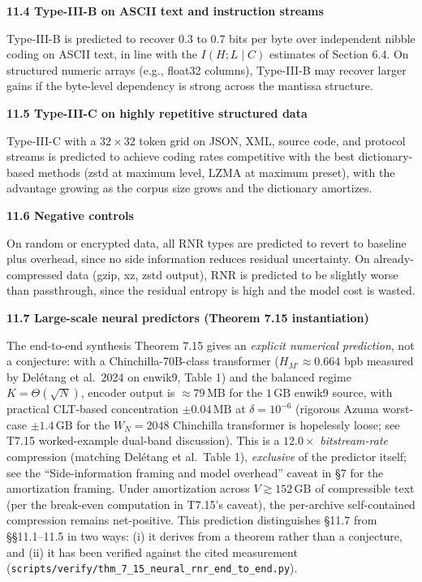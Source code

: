 \documentclass[
]{article}
\begin{document}
\textbf{11.4 Type-III-B on ASCII text and instruction streams}

Type-III-B is predicted to recover 0.3 to 0.7 bits per byte over
independent nibble coding on ASCII text, in line with the
$I(H ; L \mid C)$ estimates of Section 6.4. On structured numeric
arrays (e.g., float32 columns), Type-III-B may recover larger gains
if the byte-level dependency is strong across the mantissa structure.

\textbf{11.5 Type-III-C on highly repetitive structured data}

Type-III-C with a $32 \times 32$ token grid on JSON, XML, source
code, and protocol streams is predicted to achieve coding rates
competitive with the best dictionary-based methods (zstd at maximum
level, LZMA at maximum preset), with the advantage growing as the
corpus size grows and the dictionary amortizes.

\textbf{11.6 Negative controls}

On random or encrypted data, all RNR types are predicted to revert to
baseline plus overhead, since no side information reduces residual
uncertainty. On already-compressed data (gzip, xz, zstd output), RNR
is predicted to be slightly worse than passthrough, since the
residual entropy is high and the model cost is wasted.

\textbf{11.7 Large-scale neural predictors (Theorem 7.15 instantiation)}

The end-to-end synthesis Theorem 7.15 gives an \emph{explicit
numerical prediction}, not a conjecture: with a Chinchilla-70B-class
transformer ($H_{M'} \approx 0.664$ bpb measured by Delétang et al.\
2024 on enwik9, Table 1) and the balanced regime $K = \Theta(\sqrt{N})$,
encoder output is $\approx 79\,\mathrm{MB}$ for the $1\,\mathrm{GB}$
enwik9 source, with practical CLT-based concentration $\pm 0.04\,\mathrm{MB}$
at $\delta = 10^{-6}$ (rigorous Azuma worst-case
$\pm 1.4\,\mathrm{GB}$ for the $W_N = 2048$ Chinchilla transformer
is hopelessly loose; see T7.15 worked-example dual-band discussion).
This is a $12.0\times$ \emph{bitstream-rate}
compression (matching Delétang et al.\ Table 1), \emph{exclusive} of
the predictor itself; see the ``Side-information framing and model
overhead'' caveat in §7 for the amortization framing. Under
amortization across $V \gtrsim 152\,\mathrm{GB}$ of compressible text
(per the break-even computation in T7.15's caveat), the per-archive
self-contained compression remains net-positive. This prediction
distinguishes §11.7 from §§11.1--11.5 in two ways: (i) it derives
from a theorem rather than a conjecture, and (ii) it has been
verified against the cited measurement
(\texttt{scripts/verify/thm\_7\_15\_neural\_rnr\_end\_to\_end.py}).
\end{document}
